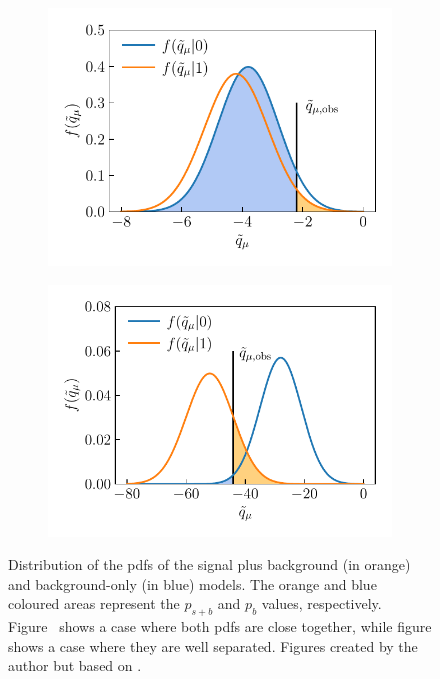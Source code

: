 \begin{figure}
	\centering
	\begin{subfigure}[b]{0.44\linewidth}
		\centering\includegraphics[width=\textwidth]{cls_1}
		\vspace{-0.5em}
		\caption{\label{fig:cls_close}}
	\end{subfigure}\hfill
	\begin{subfigure}[b]{0.45\linewidth}
		\centering\includegraphics[width=\textwidth]{cls_2}
		\vspace{-0.5em}
		\caption{\label{fig:cls_far}}
	\end{subfigure}%
	\caption{Distribution of the \glspl{pdf} of the signal plus background (in orange) and background-only (in blue) models. The orange and blue coloured areas represent the $p_{s+b}$ and $p_{b}$ values, respectively. Figure~ shows a case where both \glspl{pdf} are close together, while figure  shows a case where they are well separated. Figures created by the author but based on \cite{Cowan:2013pha}.}\label{fig:cls_method}
\end{figure}

